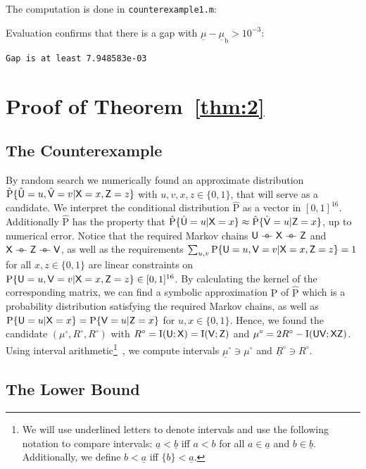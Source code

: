\documentclass[a4paper,12pt]{scrartcl}
\newcommand{\hPcond}[2]{\ensuremath{\hat{\mathrm{P}}\{#1|#2\}}}
\newcommand{\Pcond}[2]{\ensuremath{\mathrm{P}}\{#1|#2\}}
\newcommand{\hProb}{\ensuremath{\hat{\mathrm{P}}}}
\newcommand{\ul}[1]{\ensuremath{\underline{#1}}}
\newcommand{\rv}[1]{\ensuremath{\mathsf{\uppercase{#1}}}}
\newcommand{\hrv}[1]{\ensuremath{\hat{\rv{#1}}}}
\def\barcirc{\mathrel{\barcirci}}
\def\barcirci{{%
    \setbox0\hbox{\ensuremath{\relbar\!\!\relbar}}%
    \rlap{\hbox to \wd0{\hss\ensuremath{\circ}\hss}}\box0
}}
\newcommand{\mkv}{\ensuremath{\barcirc}}
\newcommand{\mutInf}[2]{\ensuremath{\mathrm{I}(#1;#2)}}
\begin{document}
The computation is done in \texttt{counterexample1.m}:


Evaluation confirms that there is a gap with $\ul\mu - \ul\mu_{\text{b}} > 10^{-3}$:

\texttt{Gap is at least 7.948583e-03}

\section{Proof of Theorem~\ref{thm:2}}
\label{sec:proof-2}

\subsection{The Counterexample}
\label{sec:counterexample}

By random search we numerically found an approximate distribution $\hPcond{\hrv u=u, \hrv v=v}{\rv x=x, \rv z=z}$ with $u,v,x,z \in \{0,1\}$, that will serve as a candidate.
We interpret the conditional distribution $\hProb$ as a vector in $[0,1]^{16}$. Additionally $\hProb$ has the property that $\hPcond{\hrv u=u}{\rv x=x} \approx \hPcond{\hrv v=u}{\rv z=x}$, up to numerical error.
Notice that the required Markov chains $\rv u \mkv \rv x \mkv \rv z$ and $\rv x \mkv \rv z \mkv \rv v$, as well as the requirements $\sum_{u,v} \Pcond{\rv u=u, \rv v=v}{\rv x=x, \rv z=z} = 1$ for all $x,z \in \{0,1\}$ are linear constraints on $\Pcond{\rv u=u, \rv v=v}{\rv x=x, \rv z=z} \in [0,1]^{16}$.
By calculating the kernel of the corresponding matrix, we can find a symbolic approximation $\mathrm{P}$ of $\hat{\mathrm{P}}$ which is a probability distribution satisfying the required Markov chains, as well as $\Pcond{\rv u=u}{\rv x=x} = \Pcond{\rv v=u}{\rv z=x}$ for $u,x \in \{0,1\}$.
Hence, we found the candidate $(\mu^\circ, R^\circ, R^\circ)$ with $R^\circ=\mutInf{\rv u}{\rv x}=\mutInf{\rv v}{\rv z}$ and $\mu^\circ = 2R^\circ - \mutInf{\rv u \rv v}{\rv x \rv z}$. Using interval arithmetic\footnote{We will use underlined letters to denote intervals and use the following notation to compare intervals: $\ul a < \ul b$ iff $a < b$ for all $a \in \ul a$ and $b \in \ul b$. Additionally, we define $b < \ul a$ iff $\{b\} < \ul a$.}~\cite{Moore2009Introduction}, we compute intervals $\ul\mu^\circ \ni \mu^\circ$ and $\ul R^\circ \ni R^\circ$.

\subsection{The Lower Bound}
\label{sec:lower-bound}
\end{document}
